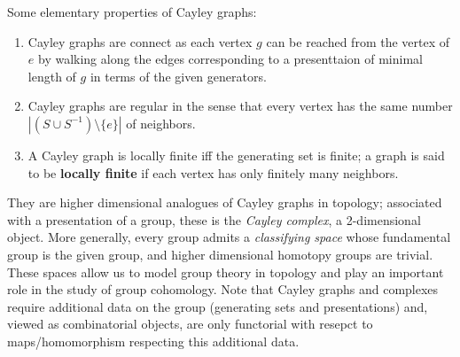 \begin{remark}
    Some elementary properties of Cayley graphs:
    \begin{enumerate}[label=(\arabic*)]
    \setlength\itemsep{-.2em}
        \item Cayley graphs are connect as each vertex $g$ can be reached from the vertex of $e$ by walking along the edges corresponding to a presenttaion of minimal length of $g$ in terms of the given generators.
        \item Cayley graphs are regular in the sense that every vertex has the same number $|(S \cup S^{-1})\setminus \{e\}| $ of neighbors.
        \item A Cayley graph is locally finite iff the generating set is finite; a graph is said to be \textbf{locally finite} if each vertex has only finitely many neighbors.
    \end{enumerate}
\end{remark}
\begin{remark}
    They are higher dimensional analogues of Cayley graphs in topology; associated with a presentation of a group, these is the \emph{Cayley complex}, a 2-dimensional object. More generally, every group admits a \emph{classifying space} whose fundamental group is the given group, and higher dimensional homotopy groups are trivial. These spaces allow us to model group theory in topology and play an important role in the study of group cohomology. Note that Cayley graphs and complexes require additional data on the group (generating sets and presentations) and, viewed as combinatorial objects, are only functorial with resepct to maps/homomorphism respecting this additional data.
\end{remark}

